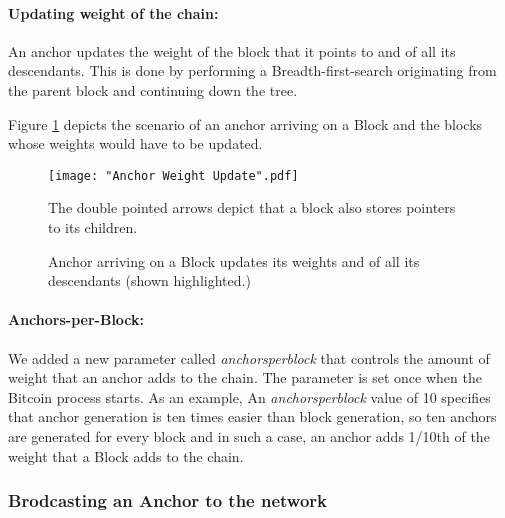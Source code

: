 \newpage
\paragraph{Updating weight of the chain:} 


An anchor updates the weight of the block that it points to and of all its descendants.
This is done by performing a Breadth-first-search originating from the parent block and continuing down the tree.

Figure \ref{fig-impl-anchor-weight-update} depicts the scenario of an anchor arriving on a Block and the blocks whose weights would have to be updated.

\setlength{\emergencystretch}{10pt}

\begin{figure}[!htb]
    \centering
    \texttt{[image: "Anchor Weight Update".pdf]}
    \caption[Weight update due to an Anchor]
    {Anchor arriving on a Block updates its weights and of all its descendants (shown highlighted.)}
    
    \medskip
    \footnotesize
    The double pointed arrows depict that a block also stores pointers to its children. 
    \label{fig-impl-anchor-weight-update}
\end{figure}

\paragraph{Anchors-per-Block:}
We added a new parameter called \textit{anchorsperblock} that controls the amount of weight that an anchor adds to the chain. The parameter is set once when the Bitcoin process starts. 
As an example, An \textit{anchorsperblock} value of 10 specifies that 
anchor generation is ten times easier than block generation, so ten anchors are generated for every block and in such a case, an anchor adds 1/10th of the weight that a Block adds to the chain.


\subsubsection{Brodcasting an Anchor to the network}

